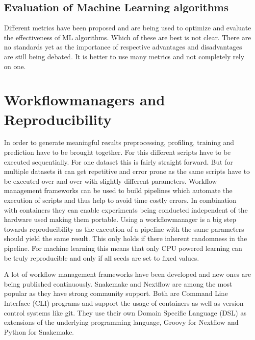 

	\subsection{Evaluation of Machine Learning algorithms}
Different metrics have been proposed and are being used to optimize and evaluate the effectiveness of ML algorithms. Which of these are best is not clear. There are no standards yet as the importance of respective advantages and disadvantages are still being debated. It is better to use many metrics and not completely rely on one.





\section{Workflowmanagers and Reproducibility}
In order to generate meaningful results preprocessing, profiling, training and prediction have to be brought together. For this different scripts have to be executed sequentially. For one dataset this is fairly straight forward. But for multiple datasets it can get repetitive and error prone as the same scripts have to be executed over and over with slightly different parameters.  
Workflow management frameworks can be used to build pipelines which automate the execution of scripts and thus help to avoid time costly errors. In combination with containers they can enable experiments being conducted independent of the hardware used making them portable. 
Using a workflowmanager is a big step towards reproducibility as the execution of a pipeline with the same parameters should yield the same result. This only holds if there inherent randomness in the pipeline. For machine learning this means that only CPU powered learning can be truly reproducible and only if all seeds are set to fixed values.

A lot of workflow management frameworks have been developed and new ones are being published continuously. Snakemake and Nextflow are among the most popular as they have strong community support.
Both are Command Line Interface (CLI) programs and support the usage of containers as well as version control systems like git. They use their own Domain Specific Language (DSL) as extensions of the underlying programming language, Groovy for Nextflow and Python for Snakemake.

